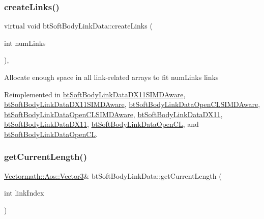 \subsubsection{\texorpdfstring{create\+Links()}{createLinks()}\hspace{0.1cm}{\footnotesize\ttfamily [2/2]}}
{\footnotesize\ttfamily virtual void bt\+Soft\+Body\+Link\+Data\+::create\+Links (\begin{DoxyParamCaption}\item[{int}]{num\+Links }\end{DoxyParamCaption})\hspace{0.3cm}{\ttfamily [inline]}, {\ttfamily [virtual]}}

Allocate enough space in all link-\/related arrays to fit num\+Links links 

Reimplemented in \hyperlink{classbtSoftBodyLinkDataDX11SIMDAware_a8b3760b7e8393ad2ff03be02c8b91854}{bt\+Soft\+Body\+Link\+Data\+D\+X11\+S\+I\+M\+D\+Aware}, \hyperlink{classbtSoftBodyLinkDataDX11SIMDAware_ab8d378a7cbe3425a7fc56e133b678b8e}{bt\+Soft\+Body\+Link\+Data\+D\+X11\+S\+I\+M\+D\+Aware}, \hyperlink{classbtSoftBodyLinkDataOpenCLSIMDAware_a43ee8b9067c214c87e073057a63071ba}{bt\+Soft\+Body\+Link\+Data\+Open\+C\+L\+S\+I\+M\+D\+Aware}, \hyperlink{classbtSoftBodyLinkDataOpenCLSIMDAware_afa62243874cf252299a3dd17eb6502c1}{bt\+Soft\+Body\+Link\+Data\+Open\+C\+L\+S\+I\+M\+D\+Aware}, \hyperlink{classbtSoftBodyLinkDataDX11_a5844647a05674cc45bf99b658ba1804a}{bt\+Soft\+Body\+Link\+Data\+D\+X11}, \hyperlink{classbtSoftBodyLinkDataDX11_afe887ef6ecba2a73287f1b3260a0f3e4}{bt\+Soft\+Body\+Link\+Data\+D\+X11}, \hyperlink{classbtSoftBodyLinkDataOpenCL_a3ebb411d58ecebab84e391588f20204f}{bt\+Soft\+Body\+Link\+Data\+Open\+CL}, and \hyperlink{classbtSoftBodyLinkDataOpenCL_acc44e1a0b702ca17a5185d39e47f9b05}{bt\+Soft\+Body\+Link\+Data\+Open\+CL}.

\mbox{\label{classbtSoftBodyLinkData_a9655532adc375429002af37fe757ef3b}} 
\subsubsection{\texorpdfstring{get\+Current\+Length()}{getCurrentLength()}\hspace{0.1cm}{\footnotesize\ttfamily [1/2]}}
{\footnotesize\ttfamily \hyperlink{classVectormath_1_1Aos_1_1Vector3}{Vectormath\+::\+Aos\+::\+Vector3}\& bt\+Soft\+Body\+Link\+Data\+::get\+Current\+Length (\begin{DoxyParamCaption}\item[{int}]{link\+Index }\end{DoxyParamCaption})\hspace{0.3cm}{\ttfamily [inline]}}


